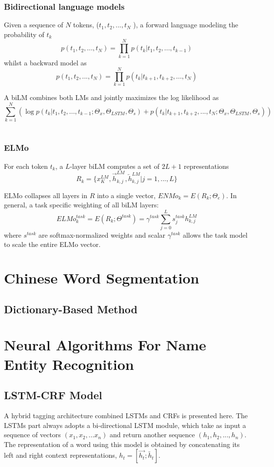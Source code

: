 \documentclass[a4paper, 12pt]{book} %
\begin{document}
\subsection{Bidirectional language models}

Given a sequence of $N$ tokens, ($t_1, t_2 , ..., t_N$ ), a forward language modeling the probability of $t_k$
$$p(t_1,t_2,...,t_N)=\prod_{k=1}^{N}{p(t_k|t_1,t_2,...,t_{k-1})}$$
whilst a backward model as 
$$p(t_1,t_2,...,t_N)=\prod_{k=1}^{N}{p(t_k|t_{k+1},t_{k+2},...,t_{N})}$$

A biLM combines both LMs and jointly maximizes the log likelihood as 
$$\sum_{k=1}^{N}{(\log{p(t_k|t_1,t_2,...,t_{k-1};\Theta_x,\Theta_{LSTM},\Theta_{s}) + p(t_k|t_{k+1},t_{k+2},...,t_{N};\Theta_x, \Theta_{LSTM},\Theta_s)})}$$ \\


\subsection{ELMo}

For each token $t_k$, a $L$-layer biLM computes a set of $2L+1$ representations
$$R_k = \{x_K^{LM}, \overrightarrow{h}_{k,j}^{LM}, \overleftarrow{h}_{k,j}^{LM} |j=1,...,L\}$$

ELMo collapses all layers in $R$ into a single vector, $ENMo_k=E(R_k;\Theta_{e})$.
In general, a task specific weighting of all biLM layers: 
$$ELMo_{k}^{task}=E(R_k;\Theta^{task})=\gamma^{task}\sum_{j=0}^{L}{s_j^{task}h_{k,j}^{LM}}$$
where $s^{task}$ are softmax-normalized weights and scalar $\gamma^{task}$ allows the task model to scale the entire ELMo vector.

\chapter{Chinese Word Segmentation}
\section{Dictionary-Based Method}

\chapter{Neural Algorithms For Name Entity Recognition}
\section{LSTM-CRF Model}
A hybrid tagging architecture combined LSTMs and CRFs is presented here. The LSTMs part always adopts a bi-directional LSTM module, which take as input a sequence of vectors $(x_1, x_2,...x_n)$ and return another sequence $(h_1,h_2,...,h_n)$. The representation of a word using this model is obtained by concatenating its left and right context representations, $h_t=[\overrightarrow{h_t};\overleftarrow{h_t}]$.
\end{document}
